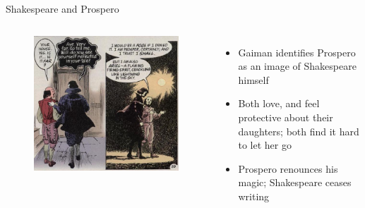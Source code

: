 \documentclass{beamer}
\begin{document}
\begin{frame}{Shakespeare and Prospero}
\begin{columns}[c]
      \begin{figure}[htp]
        \begin{center}
          \centering
          \includegraphics[scale=0.32]{prospere.jpg}
        \end{center}
      \end{figure}
      

      \begin{itemize}
      \item Gaiman identifies Prospero as an image of Shakespeare himself
      \item Both love, and feel protective about their daughters; both find it hard to let her go
      \item Prospero renounces his magic; Shakespeare ceases writing
      \end{itemize}
    \end{columns}
  \end{frame}
  
\end{document}
